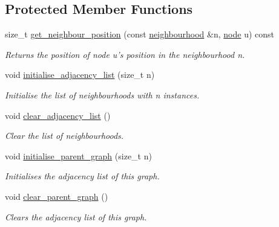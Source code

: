 \subsection*{Protected Member Functions}
\begin{DoxyCompactItemize}
\item 
size\-\_\-t \hyperlink{classlgraph_1_1utils_1_1xxgraph_aac7ef2134cad9529869f1334de7892d9}{get\-\_\-neighbour\-\_\-position} (const \hyperlink{namespacelgraph_1_1utils_a0f2ef47028a466d26841709e705390ac}{neighbourhood} \&n, \hyperlink{namespacelgraph_1_1utils_a7bd66ede3805ef121bc2835bd48de0cf}{node} u) const 
\begin{DoxyCompactList}\small\item\em Returns the position of node {\itshape u's} position in the neighbourhood {\itshape n}. \end{DoxyCompactList}\item 
\hypertarget{classlgraph_1_1utils_1_1xxgraph_a2201aaff5e9ffa29a9b3abfde705dd46}{void \hyperlink{classlgraph_1_1utils_1_1xxgraph_a2201aaff5e9ffa29a9b3abfde705dd46}{initialise\-\_\-adjacency\-\_\-list} (size\-\_\-t n)}\label{classlgraph_1_1utils_1_1xxgraph_a2201aaff5e9ffa29a9b3abfde705dd46}

\begin{DoxyCompactList}\small\item\em Initialise the list of neighbourhoods with {\itshape n} instances. \end{DoxyCompactList}\item 
\hypertarget{classlgraph_1_1utils_1_1xxgraph_a6523402d0ec66918b95de23d2bee38fc}{void \hyperlink{classlgraph_1_1utils_1_1xxgraph_a6523402d0ec66918b95de23d2bee38fc}{clear\-\_\-adjacency\-\_\-list} ()}\label{classlgraph_1_1utils_1_1xxgraph_a6523402d0ec66918b95de23d2bee38fc}

\begin{DoxyCompactList}\small\item\em Clear the list of neighbourhoods. \end{DoxyCompactList}\item 
void \hyperlink{classlgraph_1_1utils_1_1xxgraph_abd983125be7f2f2b9c812326a4a39e6d}{initialise\-\_\-parent\-\_\-graph} (size\-\_\-t n)
\begin{DoxyCompactList}\small\item\em Initialises the adjacency list of this graph. \end{DoxyCompactList}\item 
void \hyperlink{classlgraph_1_1utils_1_1xxgraph_a8d213a8dfe716d344dd51d1bd37c0e2c}{clear\-\_\-parent\-\_\-graph} ()
\begin{DoxyCompactList}\small\item\em Clears the adjacency list of this graph. \end{DoxyCompactList}\end{DoxyCompactItemize}

